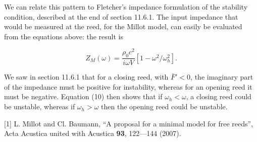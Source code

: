   We can relate this pattern to Fletcher's impedance formulation of the 
  stability condition, described at the end of section 11.6.1. The input 
  impedance that would be measured at the reed, for the Millot model, can 
  easily be evaluated from the equations above: the result is 

  \begin{equation*}Z_M(\omega) = \dfrac{\rho_0 c^2}{i \omega 
  V}\left[1-\omega^2/\omega_h^2\right] .\tag{10}\end{equation*} 

  We saw in section 11.6.1 that for a closing reed, with $\bar{F}' < 0$, the 
  imaginary part of the impedance must be positive for instability, whereas for 
  an opening reed it must be negative. Equation (10) then shows that if 
  $\omega_h < \omega$, a closing reed could be unstable, whereas if $\omega_h > 
  \omega$ then the opening reed could be unstable. 

  \sectionreferences{}[1] L. Millot and Cl. Baumann, “A proposal for a minimal 
  model for free reeds”, Acta Acustica united with Acustica \textbf{93}, 
  122—144 (2007). 